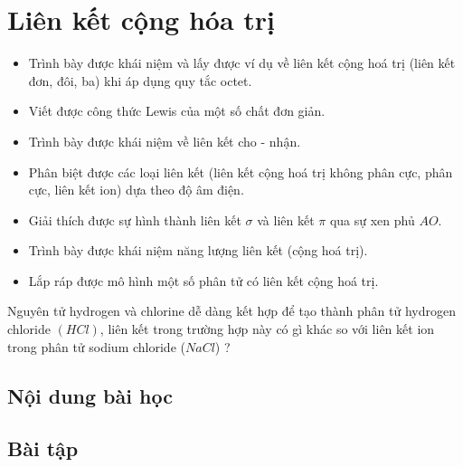 \section{Liên kết cộng hóa trị}
\begin{Muctieu}
	\begin{itemize}
		\item Trình bày được khái niệm và lấy được ví dụ về liên kết cộng hoá trị (liên kết đơn, đôi, ba) khi áp dụng quy tắc octet.
		\item Viết được công thức Lewis của một số chất đơn giản.
		\item Trình bày được khái niệm về liên kết cho - nhận.
		\item Phân biệt được các loại liên kết (liên kết cộng hoá trị không phân cực, phân cực, liên kết ion) dựa theo độ âm điện.
		\item Giải thích được sự hình thành liên kết $\sigma$ và liên kết $\pi$ qua sự xen phủ $AO$.
		\item Trình bày được khái niệm năng lượng liên kết (cộng hoá trị).
		\item Lắp ráp được mô hình một số phân tử có liên kết cộng hoá trị.
	\end{itemize}
\end{Muctieu}
\begin{kd}
	Nguyên tử hydrogen và chlorine dễ dàng kết hợp để tạo thành phân tử hydrogen chloride $(HCl)$, liên kết trong trường hợp này có gì khác so với liên kết ion trong phân tử sodium chloride ($NaCl$) ?
\end{kd}
\subsection{Nội dung bài học}

\subsection{Bài tập}
